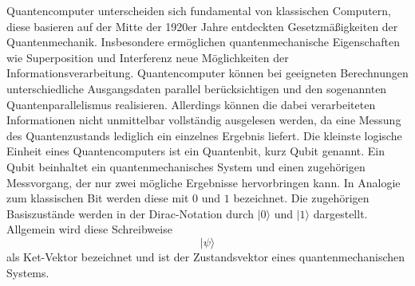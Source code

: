 Quantencomputer unterscheiden sich fundamental von klassischen Computern, diese basieren auf der Mitte der 1920er Jahre entdeckten Gesetzmäßigkeiten der Quantenmechanik. Insbesondere ermöglichen quantenmechanische Eigenschaften wie Superposition und Interferenz neue Möglichkeiten der Informationsverarbeitung. Quantencomputer können bei geeigneten Berechnungen unterschiedliche Ausgangsdaten parallel berücksichtigen und den sogenannten Quantenparallelismus realisieren. Allerdings können die dabei verarbeiteten Informationen nicht unmittelbar vollständig ausgelesen werden, da eine Messung des Quantenzustands lediglich ein einzelnes Ergebnis liefert. Die kleinste logische Einheit eines Quantencomputers ist ein Quantenbit, kurz Qubit genannt. Ein Qubit beinhaltet ein quantenmechanisches System und einen zugehörigen Messvorgang, der nur zwei mögliche Ergebnisse hervorbringen kann. In Analogie zum klassischen Bit werden diese mit $0$
und $1$ bezeichnet. Die zugehörigen Basiszustände werden in der Dirac-Notation durch $\lvert 0\rangle$ und $\lvert 1\rangle$ dargestellt. Allgemein wird diese Schreibweise
\[
    \lvert \psi \rangle
\]
als Ket-Vektor bezeichnet und ist der Zustandsvektor eines quantenmechanischen Systems.

